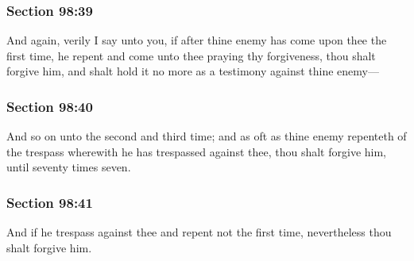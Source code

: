 	\subsubsection{Section 98:39} %
		\label{DC98-39}

		And again, verily I say unto you, if after thine enemy has come upon thee the first time, he repent and come unto thee praying thy forgiveness, thou shalt forgive him, and shalt hold it no more as a testimony against thine enemy---


	\subsubsection{Section 98:40} %
		\label{DC98-40}

		And so on unto the second and third time; and as oft as thine enemy repenteth of the trespass wherewith he has trespassed against thee, thou shalt forgive him, until seventy times seven.


	\subsubsection{Section 98:41} %
		\label{DC98-41}

		And if he trespass against thee and repent not the first time, nevertheless thou shalt forgive him.


